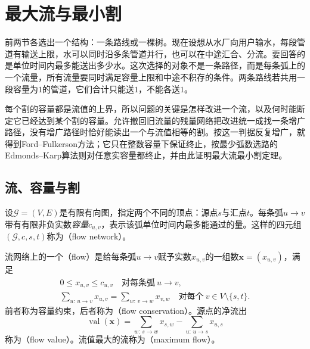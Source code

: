 
\section{最大流与最小割}
\label{sec:graph-max-flow}

前两节各选出一个结构：一条路线或一棵树。现在设想从水厂向用户输水，每段管道有输送上限，水可以同时沿多条管道并行，也可以在中途汇合、分流。要回答的是单位时间内最多能送出多少水。这次选择的对象不是一条路径，而是每条弧上的一个流量，所有流量要同时满足容量上限和中途不积存的条件。两条路线若共用一段容量为$1$的管道，它们合计只能送$1$，不能各送$1$。

每个割的容量都是流值的上界，所以问题的关键是怎样改进一个流，以及何时能断定它已经达到某个割的容量。允许撤回旧流量的残量网络把改进统一成找一条增广路径，没有增广路径时恰好能读出一个与流值相等的割。按这一判据反复增广，就得到Ford--Fulkerson方法；它只在整数容量下保证终止，按最少弧数选路的Edmonds--Karp算法则对任意实容量都终止，并由此证明最大流最小割定理。

\subsection{流、容量与割}
\label{sec:graph-opt-flow-cut}

设$\mathcal G=(V,E)$是有限有向图，指定两个不同的顶点：源点$s$与汇点$t$。每条弧$u\to v$带有有限非负实数\emph{容量}$c_{u,v}$，表示该弧单位时间内最多能通过的量。这样的四元组$(\mathcal G,c,s,t)$称为（flow network）。

\begin{definition}[流与流值]
\label{def:graph-opt-flow}
流网络上的一个（flow）是给每条弧$u\to v$赋予实数$x_{u,v}$的一组数$\bm x=(x_{u,v})$，满足
\begin{gather}
  0\leq x_{u,v}\leq c_{u,v}\quad\text{对每条弧}\ u\to v,\label{eq:graph-opt-capacity}\\
  \sum_{u:\,u\to v}x_{u,v}=\sum_{w:\,v\to w}x_{v,w}\quad\text{对每个}\ v\in V\setminus\{s,t\}.\label{eq:graph-opt-conservation}
\end{gather}
前者称为容量约束，后者称为（flow conservation）。源点的净流出
\[
  \operatorname{val}(\bm x)=\sum_{w:\,s\to w}x_{s,w}-\sum_{u:\,u\to s}x_{u,s}
\]
称为（flow value）。流值最大的流称为（maximum flow）。
\end{definition}

